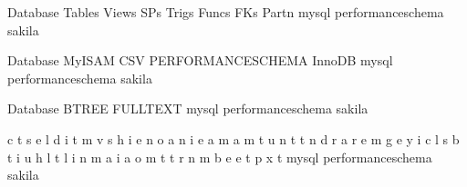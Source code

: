 \documentclass[letterpaper,10pt,english]{sphinxmanual}
\begin{document}
\begin{sphinxVerbatim}[commandchars=\\\{\}]

  Database           Tables Views SPs Trigs Funcs   FKs Partn
  mysql                  
  performance\PYGZus{}schema     
  sakila                                       

  Database           MyISAM CSV PERFORMANCE\PYGZus{}SCHEMA InnoDB
  mysql                     
  performance\PYGZus{}schema                            
  sakila                                              

  Database           BTREE FULLTEXT
  mysql                 
  performance\PYGZus{}schema
  sakila                        

                       c   t   s   e   l   d   i   t   m   v   s
                       h   i   e   n   o   a   n   i   e   a   m
                       a   m   t   u   n   t   t   n   d   r   a
                       r   e       m   g   e       y   i   c   l
                           s           b   t       i   u   h   l
                           t           l   i       n   m   a   i
                           a           o   m       t   t   r   n
                           m           b   e           e       t
                           p                           x
                                                       t
                       
  mysql                                          
  performance\PYGZus{}schema                                   
  sakila                                           
\end{sphinxVerbatim}
\end{document}
